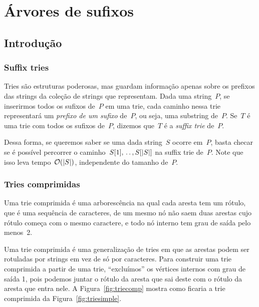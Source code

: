 \chapter{Árvores de sufixos} \label{chap:suffixtree}

\section{Introdução}

\subsection{Suffix tries}

Tries são estruturas poderosas, mas guardam informação apenas sobre os prefixos das strings da coleção de strings que representam. Dada uma string~$P$, se inserirmos todos os sufixos de~$P$ em uma trie, cada caminho nessa trie representará um \emph{prefixo de um sufixo} de~$P$, ou seja, uma substring de~$P$. Se~$T$ é uma trie com todos os sufixos de~$P$, dizemos que~$T$ é a \emph{suffix trie} de~$P$.

Dessa forma, se queremos saber se uma dada string~$S$ ocorre em~$P$, basta checar se é possível percorrer o caminho~$S[1], \,.\,.\,, S[|S|]$ na suffix trie de~$P$. Note que isso leva tempo~$\mathcal{O}(|S|)$, independente do tamanho de~$P$.

\subsection{Tries comprimidas}

\begin{definition}
Uma trie comprimida é uma arborescência na qual cada aresta tem um rótulo, que é uma sequência de caracteres, de um mesmo nó não saem duas arestas cujo rótulo começa com o mesmo caractere, e todo nó interno tem grau de saída pelo menos~2.
\end{definition}

Uma trie comprimida é uma generalização de tries em que as arestas podem ser rotuladas por strings em vez de só por caracteres. Para construir uma trie comprimida a partir de uma trie, ``excluímos'' os vértices internos com grau de saída 1, pois podemos juntar o rótulo da aresta que sai deste com o rótulo da aresta que entra nele.
A Figura~\ref{fig:triecomp} mostra como ficaria a trie comprimida da Figura~\ref{fig:triesimple}.

